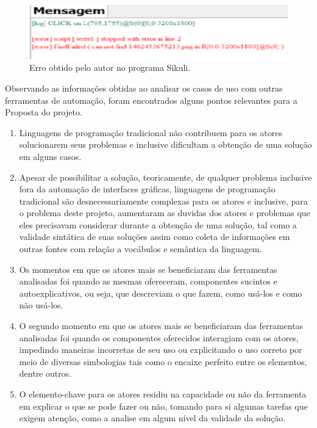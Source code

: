 \documentclass[tg]{mdtufsm}
\begin{document}
            	\begin{figure}[!htb]
            		{\centering
            		\includegraphics[width=1.0\textwidth]{imagens/sikuli_error}
            		\caption{Erro obtido pelo autor no programa Sikuli.}
            		\label{fig:erroSikuli}}
            	\end{figure}

                Observando as informações obtidas ao analisar os casos de uso com outras ferramentas de automação, foram encontrados alguns pontos relevantes para a Proposta do projeto.

                \begin{enumerate}
                   \item Linguagens de programação tradicional não contribuem para os atores solucionarem seus problemas e inclusive dificultam a obtenção de uma solução em alguns casos.

                   \item Apesar de possibilitar a solução, teoricamente, de qualquer problema inclusive fora da automação de interfaces gráficas, linguagens de programação tradicional são desnecessariamente complexas para os atores e inclusive, para o problema deste projeto, aumentaram as duvidas dos atores e problemas que eles precisavam considerar durante a obtenção de uma solução, tal como a validade sintática de suas soluções assim como coleta de informações em outras fontes com relação a vocábulos e semântica da linguagem.

                   \item Os momentos em que os atores mais se beneficiaram das ferramentas analisadas foi quando as mesmas ofereceram, componentes sucintos e autoexplicativos, ou seja, que descreviam o que fazem, como usá-los e como não usá-los.

                   \item O segundo momento em que os atores mais se beneficiaram das ferramentas analisadas foi quando os componentes oferecidos interagiam com os atores, impedindo maneiras incorretas de seu uso ou explicitando o uso correto por meio de diversas simbologias tais como o encaixe perfeito entre os elementos, dentre outros.

                   \item O elemento-chave para os atores residiu na capacidade ou não da ferramenta em explicar o que se pode fazer ou não, tomando para sí algumas tarefas que exigem atenção, como a analise em algum nível da validade da solução.
                \end{enumerate}
\end{document}
